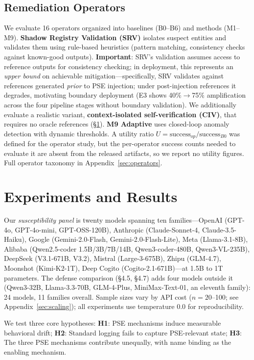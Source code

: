 \documentclass{article}
\theoremstyle{plain}
\theoremstyle{definition}
\newcommand{\pse}{\textsc{PSE}}
\begin{document}
\subsection{Remediation Operators}

We evaluate 16 operators organized into baselines (B0--B6) and methods (M1--M9). \textbf{Shadow Registry Validation (SRV)} isolates suspect entities and validates them using rule-based heuristics (pattern matching, consistency checks against known-good outputs). \textbf{Important}: SRV's validation assumes access to reference outputs for consistency checking; in deployment, this represents an \emph{upper bound} on achievable mitigation---specifically, SRV validates against references generated \emph{prior} to PSE injection; under post-injection references it degrades, motivating boundary deployment (E3 shows 40\%$\to$75\% amplification across the four pipeline stages without boundary validation). We additionally evaluate a realistic variant, \textbf{context-isolated self-verification (CIV)}, that requires no oracle references (\S\ref{sec:experiments}). \textbf{M9 Adaptive} uses closed-loop anomaly detection with dynamic thresholds. A utility ratio $U = \text{success}_{op}/\text{success}_{B0}$ was defined for the operator study, but the per-operator success counts needed to evaluate it are absent from the released artifacts, so we report no utility figures. Full operator taxonomy in Appendix~\ref{sec:operators}.

\section{Experiments and Results}
\label{sec:experiments}

Our \emph{susceptibility panel} is twenty models spanning ten families---OpenAI (GPT-4o, GPT-4o-mini, GPT-OSS-120B), Anthropic (Claude-Sonnet-4, Claude-3.5-Haiku), Google (Gemini-2.0-Flash, Gemini-2.0-Flash-Lite), Meta (Llama-3.1-8B), Alibaba (Qwen2.5-coder 1.5B/3B/7B/14B, Qwen3-coder-480B, Qwen3-VL-235B), DeepSeek (V3.1-671B, V3.2), Mistral (Large-3-675B), Zhipu (GLM-4.7), Moonshot (Kimi-K2-1T), Deep Cogito (Cogito-2.1-671B)---at 1.5B to 1T parameters. The defense comparison (\S4.5, \S4.7) adds four models outside it (Qwen3-32B, Llama-3.3-70B, GLM-4-Plus, MiniMax-Text-01, an eleventh family): 24 models, 11 families overall. Sample sizes vary by API cost ($n=20$--100; see Appendix~\ref{sec:scaling}); all experiments use temperature 0.0 for reproducibility.

We test three core hypotheses: \textbf{H1}: \pse{} mechanisms induce measurable behavioral drift; \textbf{H2}: Standard logging fails to capture \pse{}-relevant state; \textbf{H3}: The three \pse{} mechanisms contribute unequally, with name binding as the enabling mechanism.
\end{document}
